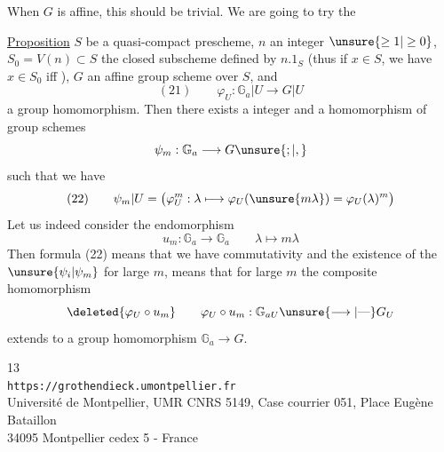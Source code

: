 When $G$ is affine, this should be trivial. We are going to try the

\uline{Proposition}  $S$ be a quasi-compact prescheme, $n$ an integer $\unsure{\geq1|\geq0}$,  $S_0=V(n)\subset S$ the closed subscheme defined by $n.1_S$ (thus if $x\in S$, we have $x\in S_0$ iff   ),  $G$ an affine group scheme  over $S$, and
\[
(21)\qquad\varphi_U:\mathbb G_a|U\longrightarrow G|U
\]
a group homomorphism.  Then there exists a  integer    and a homomorphism of group schemes
\[
\psi_m:\mathbb G_a\longrightarrow G\unsure{;|,}
\]
such that we have
\[
(22)\qquad\psi_m|U=\bigl(\varphi_U^m:\lambda\longmapsto\varphi_U(\unsure{m\lambda})=\varphi_U(\lambda)^m\bigr)
\]
Let us indeed consider the endomorphism
\[
u_m:\mathbb G_a\longrightarrow\mathbb G_a\qquad\lambda\longmapsto m\lambda
\]
Then formula (22) means that we have commutativity
and the existence of the $\unsure{\psi_i|\psi_m}$ for large $m$, means that for large $m$ the composite homomorphism
\[
\deleted{\varphi_U\circ u_m}\qquad\varphi_U\circ u_m:\mathbb G_{aU}\unsure{\longrightarrow|\text{---}}G_U
\]
extends to a group homomorphism $\mathbb G_a\longrightarrow G$.

\begin{center}
\small
13\\
\texttt{https://grothendieck.umontpellier.fr}\\
Université de Montpellier, UMR CNRS 5149, Case courrier 051, Place Eugène Bataillon\\
34095 Montpellier cedex 5 - France
\end{center}


